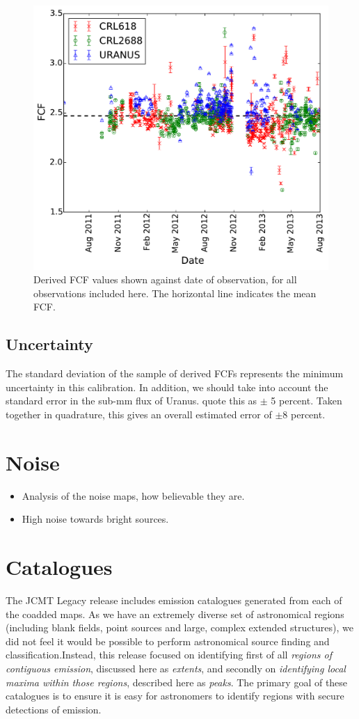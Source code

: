 \documentclass[usenatbib]{mnras}
\begin{document}
\begin{figure}
  \centering
  \includegraphics[width=0.7\linewidth]{Legacy_calibration_vsdate}
  \caption{Derived FCF values shown against date of observation, for
    all observations included here. The horizontal line indicates the mean FCF.}
  \label{fig:calibvstime}
\end{figure}

\subsection{Uncertainty}

The standard deviation of the sample of derived FCFs represents the
minimum uncertainty in this calibration. In addition, we should take
into account the standard error in the sub-mm flux of
Uranus. \citet{Dempsey2013} quote this as $\pm$ 5 percent. Taken
together in quadrature, this gives an overall estimated error of
$\pm$8 percent.



\section{Noise}
\begin{itemize}
\item Analysis of the noise maps, how believable they are.
\item High noise towards bright sources.
\end{itemize}


\section{Catalogues}
The JCMT Legacy release includes emission catalogues generated from
each of the coadded maps. As we have an extremely diverse set of
astronomical regions (including blank fields, point sources and large,
complex extended structures), we did not feel it would be possible to
perform astronomical source finding and classification.Instead, this
release focused on identifying first of all \emph{regions of
  contiguous emission}, discussed here as \emph{extents}, and secondly
on \emph{identifying local maxima within those regions}, described
here as \emph{peaks}. The primary goal of these catalogues is to
ensure it is easy for astronomers to identify regions with secure
detections of emission.
\end{document}
